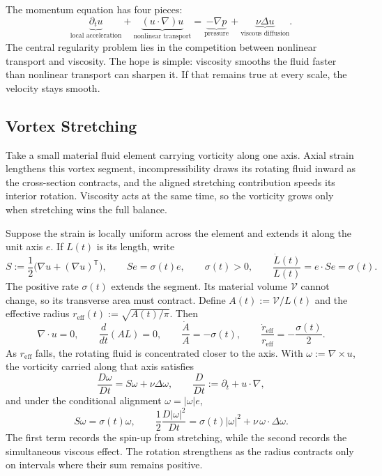 
The momentum equation has four pieces:
\[
  \underbrace{\partial_t u}_{\text{local acceleration}}
  +
  \underbrace{(u\cdot\nabla)u}_{\text{nonlinear transport}}
  =
  \underbrace{-\nabla p}_{\text{pressure}}
  +
  \underbrace{\nu\Delta u}_{\text{viscous diffusion}}.
\]
The central regularity problem lies in the competition between nonlinear transport and viscosity.
The hope is simple: viscosity smooths the fluid faster than nonlinear transport can sharpen it.
If that remains true at every scale, the velocity stays smooth.

\subsection{Vortex Stretching}\label{sub:ThePerfectlyStretchingVortex}

Take a small material fluid element carrying vorticity along one axis. Axial strain lengthens this vortex segment, incompressibility draws its rotating fluid inward as the cross-section contracts, and the aligned stretching contribution speeds its interior rotation. Viscosity acts at the same time, so the vorticity grows only when stretching wins the full balance.

Suppose the strain is locally uniform across the element and extends it along the unit axis $e$. If $L(t)$ is its length, write
\[
  S:=\frac12\bigl(\nabla u+(\nabla u)^{\mathsf T}\bigr),
  \qquad
  Se=\sigma(t)e,
  \qquad
  \sigma(t)>0,
  \qquad
  \frac{\dot L(t)}{L(t)}
  =
  e\cdot Se
  =
  \sigma(t).
\]
The positive rate $\sigma(t)$ extends the segment. Its material volume $\mathcal V$ cannot change, so its transverse area must contract. Define $A(t):=\mathcal V/L(t)$ and the effective radius $r_{\mathrm{eff}}(t):=\sqrt{A(t)/\pi}$. Then
\[
  \nabla\cdot u=0,
  \qquad
  \frac{d}{dt}(A L)=0,
  \qquad
  \frac{\dot A}{A}=-\sigma(t),
  \qquad
  \frac{\dot r_{\mathrm{eff}}}{r_{\mathrm{eff}}}
  =
  -\frac{\sigma(t)}{2}.
\]
As $r_{\mathrm{eff}}$ falls, the rotating fluid is concentrated closer to the axis. With $\omega:=\nabla\times u$, the vorticity carried along that axis satisfies
\[
  \frac{D\omega}{Dt}
  =
  S\omega+\nu\Delta\omega,
  \qquad
  \frac{D}{Dt}
  :=
  \partial_t+u\cdot\nabla,
\]
and under the conditional alignment $\omega=|\omega|e$,
\[
  S\omega
  =
  \sigma(t)\omega,
  \qquad
  \frac12\frac{D|\omega|^2}{Dt}
  =
  \sigma(t)|\omega|^2
  +
  \nu\,\omega\cdot\Delta\omega.
\]
The first term records the spin-up from stretching, while the second records the simultaneous viscous effect. The rotation strengthens as the radius contracts only on intervals where their sum remains positive.

